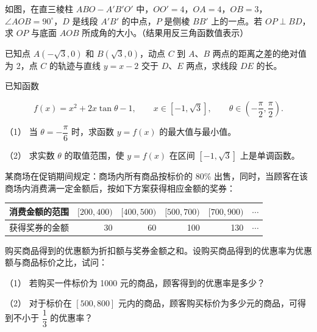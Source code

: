 \Needspace{0.4\textheight}
\begin{question}
如图，在直三棱柱 $ABO-A'B'O'$ 中，$OO'=4$，$OA=4$，$OB=3$，$\angle AOB=90^\circ$，$D$ 是线段 $A'B'$ 的中点，$P$ 是侧棱 $BB'$ 上的一点。若 $OP\perp BD$，求 $OP$ 与底面 $AOB$ 所成角的大小。（结果用反三角函数值表示）
\nopagebreak[4]
\begin{center}\end{center}
\nopagebreak[4]
\end{question}
\begin{question}
已知点 $A(-\sqrt3,0)$ 和 $B(\sqrt3,0)$，动点 $C$ 到 $A\text{、}B$ 两点的距离之差的绝对值为 2，点 $C$ 的轨迹与直线 $y=x-2$ 交于 $D\text{、}E$ 两点，求线段 $DE$ 的长。

\end{question}
\begin{question}
已知函数

\nopagebreak[4]
\[
f(x)=x^2+2x\tan\theta-1,\qquad x\in[-1,\sqrt3],
\qquad\theta\in\left(-\frac\pi2,\frac\pi2\right).
\]

（1） 当 $\theta=-\dfrac\pi6$ 时，求函数 $y=f(x)$ 的最大值与最小值。

（2） 求实数 $\theta$ 的取值范围，使 $y=f(x)$ 在区间 $[-1,\sqrt3]$ 上是单调函数。

\end{question}
\begin{question}
某商场在促销期间规定：商场内所有商品按标价的 80\% 出售，同时，当顾客在该商场内消费满一定金额后，按如下方案获得相应金额的奖券：

\begin{center}
\begin{tabular}{lrrrrr}
\toprule
消费金额的范围 & $[200,400)$ & $[400,500)$ & $[500,700)$ & $[700,900)$ & $\cdots$ \\
\midrule
获得奖券的金额 & 30 & 60 & 100 & 130 & $\cdots$ \\
\bottomrule
\end{tabular}
\end{center}

购买商品得到的优惠额为折扣额与奖券金额之和。设购买商品得到的优惠率为优惠额与商品标价之比，试问：

（1） 若购买一件标价为 1000 元的商品，顾客得到的优惠率是多少？

（2） 对于标价在 $[500,800]$ 元内的商品，顾客购买标价为多少元的商品，可得到不小于 $\dfrac13$ 的优惠率？

\end{question}
